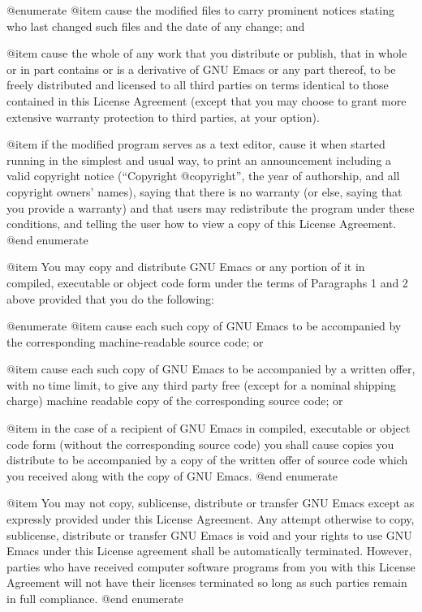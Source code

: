 @enumerate
@item
cause the modified files to carry prominent notices stating
who last changed such files and the date of any change; and

@item
cause the whole of any work that you distribute or publish,
that in whole or in part contains or is a derivative of GNU Emacs
or any part thereof, to be freely distributed
and licensed to all third parties on terms identical to those
contained in this License Agreement (except that you may choose
to grant more extensive warranty protection to third parties,
at your option).

@item
if the modified program serves as a text editor, cause it
when started running in the simplest and usual way, to print
an announcement including a valid copyright notice (``Copyright
@copyright{}'', the year of authorship, and all copyright owners' names),
saying that there is no warranty (or else, saying that you provide
a warranty) and that users may redistribute the program under
these conditions, and telling the user how to view a copy of
this License Agreement.
@end enumerate

@item
You may copy and distribute GNU Emacs or any portion of it in
compiled, executable or object code form under the terms of Paragraphs
1 and 2 above provided that you do the following:

@enumerate
@item
cause each such copy of GNU Emacs to be accompanied by the
corresponding machine-readable source code; or

@item
cause each such copy of GNU Emacs to be accompanied by a written
offer, with no time limit, to give any third party free (except
for a nominal shipping charge) machine readable copy of the
corresponding source code; or

@item
in the case of a recipient of GNU Emacs in compiled, executable
or object code form (without the corresponding source code) you
shall cause copies you distribute to be accompanied by a copy of
the written offer of source code which you received along with
the copy of GNU Emacs.
@end enumerate

@item
You may not copy, sublicense, distribute or transfer GNU Emacs except
as expressly provided under this License Agreement.  Any attempt
otherwise to copy, sublicense, distribute or transfer GNU Emacs is
void and your rights to use GNU Emacs under this License agreement
shall be automatically terminated.  However, parties who have received
computer software programs from you with this License Agreement will
not have their licenses terminated so long as such parties remain in
full compliance.
@end enumerate

